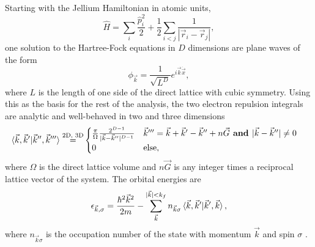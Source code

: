 \documentclass{revtex4}
\begin{document}
	Starting with the Jellium Hamiltonian in atomic units, 
	\begin{equation}\label{hamiltonian}
		\hat{H} = \sum_i \frac{\hat{p}_i^2}{2}  + \frac{1}{2} \sum_{i < j} \frac{1}{|\vec{r}_i - 
		\vec{r}_j|},
	\end{equation}
	one solution to the Hartree-Fock equations in $D$ dimensions are plane waves of the form	
	\begin{equation}\label{planewave}
		\phi_{\vec{k}} =
		   \frac{1} { \sqrt{L ^ D} } e ^ {i \vec{k} \dot \vec{x}},
	\end{equation}
	where $L$ is the length of one side of the direct lattice with cubic symmetry. Using this as the 
	basis for the rest of the analysis, the two electron repulsion integrals are analytic and 
	well-behaved in two and three dimensions \cite{Delyon2008}\cite{Guiliani2005}
  \begin{align}
   	\braket{\vec{k}, \vec{k}' | \vec{k}'', \vec{k}'''} 
  	  \stackrel{ \text{2D, 3D} }{=}&
   	\begin{cases} 
   	\frac{\pi} {\Omega} \frac{ 2^{D-1} } { | \vec{k} - \vec{k}'' | ^ {D-1} } 
   	& \vec{k}''' = \vec{k} + \vec{k}' - \vec{k}'' + n\vec{G} \textbf{ and } | \vec{k} - 
   	\vec{k}''| \neq 0 \\
   	0 
   	& \text{else},
   	\end{cases}
  \end{align}
  where $\Omega$ is the direct lattice volume and $n\vec{G}$ is any integer times a reciprocal 
  lattice vector of the 
  system. The orbital energies are
  \begin{equation}\label{eq:hf_orb_energy}
  \epsilon_{\vec{k},\sigma}=
  \frac{\hbar^2\vec{k}^2}{2m} - \sum\limits_{\vec{k}}^{|\vec{k}|< 
  k_f}n_{\vec{k}\sigma}\braket{\vec{k}, \vec{k}' |\vec{k}', \vec{k}},
  \end{equation}
  where $n_{\vec{k}\sigma}$ is the occupation number of the state with momentum $\vec{k}$ and 
  spin $\sigma$ \cite{Guiliani2005}. 
    
\end{document}
